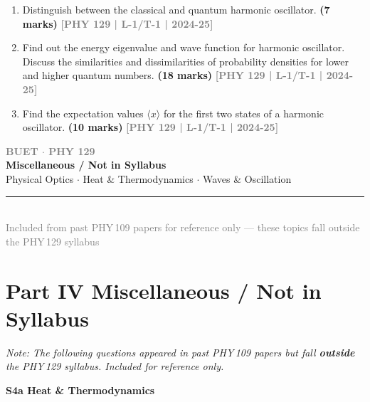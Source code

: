 \documentclass[12pt,a3paper]{article}
\newcommand{\yr}[1]{\hfill\textcolor{gray}{\small\textbf{[#1]}}}
\newcommand{\mk}[1]{\textcolor{orange!70!black}{\small\textbf{(#1 marks)}}}
\newcommand{\secdivider}[6]{%
  \newpage\thispagestyle{empty}%
  \vspace*{\fill}%
  \begin{tcolorbox}[enhanced,colback=#6!7,colframe=#5,boxrule=1.5pt,arc=8pt,
    left=20pt,right=20pt,top=22pt,bottom=22pt,
    shadow={3pt}{-3pt}{0pt}{black!15}]
    \centering
    {\large\textcolor{gray}{\textbf{BUET $\cdot$ PHY 129}}}\\[8pt]
    {\fontsize{22}{28}\selectfont\bfseries\textcolor{#5}{#2}}\\[6pt]
    {\fontsize{13}{17}\selectfont\textcolor{dgray}{#3}}\\[10pt]
    \textcolor{#5!60}{\rule{0.5\textwidth}{0.5pt}}\\[6pt]
    {\small\textcolor{gray}{#4}}
  \end{tcolorbox}%
  \vspace*{\fill}\newpage%
}
\newcommand{\subtopic}[2]{%
  \vspace{10pt}
  \noindent\begin{tcolorbox}[colback=#1!8,colframe=#1,boxrule=0.6pt,arc=4pt,
    left=6pt,right=6pt,top=4pt,bottom=4pt]
    \small\bfseries\textcolor{#1}{#2}
  \end{tcolorbox}
  \vspace{2pt}
}
\begin{document}
\begin{enumerate}
    \item Distinguish between the classical and quantum harmonic oscillator.
    \mk{7} \yr{PHY 129 | L-1/T-1 | 2024-25}

    \item Find out the energy eigenvalue and wave function for harmonic oscillator. Discuss the similarities and dissimilarities of probability densities for lower and higher quantum numbers.
     \mk{18} \yr{PHY 129 | L-1/T-1 | 2024-25}

    \item Find the expectation values $\langle x \rangle$ for the first two states of a harmonic oscillator.
 \mk{10} \yr{PHY 129 | L-1/T-1 | 2024-25}

  \end{enumerate}

\secdivider{Part IV}{Miscellaneous / Not in Syllabus}%
  {Physical Optics $\cdot$ Heat \& Thermodynamics $\cdot$ Waves \& Oscillation}%
  {Included from past PHY\,109 papers for reference only --- these topics fall outside the PHY\,129 syllabus}%
  {cE}{orange}

\label{sec:S4}
\section*{Part IV \quad Miscellaneous / Not in Syllabus}

{\small\textcolor{cE}{\textit{Note: The following questions appeared in past PHY\,109 papers but fall \textbf{outside} the PHY\,129 syllabus. Included for reference only.}}
\vspace{4pt}}

\label{sec:s4a}
\subtopic{cA}{S4a \quad Heat \& Thermodynamics}
\end{document}
